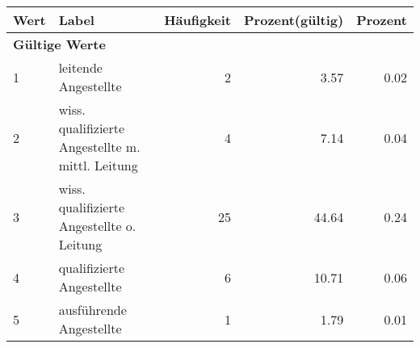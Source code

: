      \begin{longtable}{lXrrr}
     \toprule
     \textbf{Wert} & \textbf{Label} & \textbf{Häufigkeit} & \textbf{Prozent(gültig)} & \textbf{Prozent} \\
     \endhead
     \midrule
     \multicolumn{5}{l}{\textbf{Gültige Werte}}\\

     1 &
     \multicolumn{1}{X}{ leitende Angestellte   } &


       \num{2} &
       \num[round-mode=places,round-precision=2]{3,57} &
         \num[round-mode=places,round-precision=2]{0,02} \\

     2 &
     \multicolumn{1}{X}{ wiss. qualifizierte Angestellte m. mittl. Leitung   } &


       \num{4} &
       \num[round-mode=places,round-precision=2]{7,14} &
         \num[round-mode=places,round-precision=2]{0,04} \\

     3 &
     \multicolumn{1}{X}{ wiss. qualifizierte Angestellte o. Leitung   } &


       \num{25} &
       \num[round-mode=places,round-precision=2]{44,64} &
         \num[round-mode=places,round-precision=2]{0,24} \\

     4 &
     \multicolumn{1}{X}{ qualifizierte Angestellte   } &


       \num{6} &
       \num[round-mode=places,round-precision=2]{10,71} &
         \num[round-mode=places,round-precision=2]{0,06} \\

     5 &
     \multicolumn{1}{X}{ ausführende Angestellte   } &


       \num{1} &
       \num[round-mode=places,round-precision=2]{1,79} &
         \num[round-mode=places,round-precision=2]{0,01} \\


\end{longtable}
